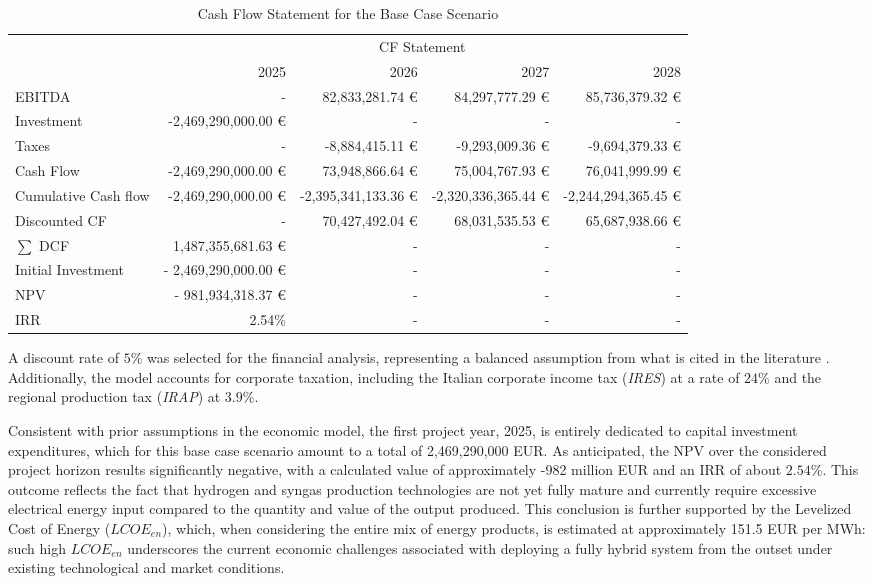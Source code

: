 \begin{table}[!htbp]
\centering
\scriptsize
\begin{tabular}{lrrrr}
\toprule
 & \multicolumn{4}{c}{CF Statement} \\
\cmidrule(l){2-5}
 & 2025 & 2026 & 2027 & 2028 \\
\midrule
EBITDA & - & 82,833,281.74 € & 84,297,777.29 € & 85,736,379.32 € \\
Investment & -2,469,290,000.00 € & - & - & - \\
Taxes & - & -8,884,415.11 € & -9,293,009.36 € & -9,694,379.33 € \\
Cash Flow & -2,469,290,000.00 € & 73,948,866.64 € & 75,004,767.93 € & 76,041,999.99 € \\
Cumulative Cash flow & -2,469,290,000.00 € & -2,395,341,133.36 € & -2,320,336,365.44 € & -2,244,294,365.45 € \\
Discounted CF & - & 70,427,492.04 € & 68,031,535.53 € & 65,687,938.66 € \\
$\sum$ DCF & 1,487,355,681.63 € & - & - & - \\
Initial Investment & - 2,469,290,000.00 € & - & - & - \\
NPV & - 981,934,318.37 € & - & - & - \\
IRR & 2.54\% & - & - & - \\
\bottomrule
\end{tabular}
\caption{Cash Flow Statement for the Base Case Scenario}
\end{table}

A discount rate of $5\%$ was selected for the financial analysis, representing a balanced assumption from what is cited in the literature \cite{IEA_OECDNEA_2020}. Additionally, the model accounts for corporate taxation, including the Italian corporate income tax (\textit{IRES}) at a rate of $24\%$ and the regional production tax (\textit{IRAP}) at $3.9\%$.

Consistent with prior assumptions in the economic model, the first project year, 2025, is entirely dedicated to capital investment expenditures, which for this base case scenario amount to a total of 2,469,290,000 EUR. As anticipated, the NPV over the considered project horizon results significantly negative, with a calculated value of approximately -982 million EUR and an IRR of about $2.54\%$. This outcome reflects the fact that hydrogen and syngas production technologies are not yet fully mature and currently require excessive electrical energy input compared to the quantity and value of the output produced. This conclusion is further supported by the Levelized Cost of Energy ($LCOE_{en}$), which, when considering the entire mix of energy products, is estimated at approximately 151.5 EUR per MWh: such high $LCOE_{en}$ underscores the current economic challenges associated with deploying a fully hybrid system from the outset under existing technological and market conditions.

